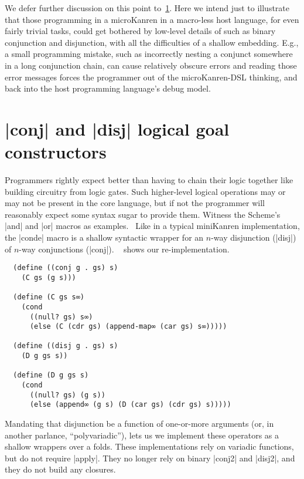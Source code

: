 \documentclass[sigplan,screen,draft,anonymous,review,natbib=false]{acmart}
\begin{document}
We defer further discussion on this point to~\cref{sec:conde}. Here we
intend just to illustrate that those programming in a microKanren in a
macro-less host language, for even fairly trivial tasks, could get
bothered by low-level details of such as binary conjunction and
disjunction, with all the difficulties of a shallow embedding. E.g., a
small programming mistake, such as incorrectly nesting a conjunct
somewhere in a long conjunction chain, can cause relatively obscure
errors and reading those error messages forces the programmer out of
the microKanren-DSL thinking, and back into the host programming
language's debug model.

\section{\rackinline|conj| and \rackinline|disj| logical goal
  constructors}\label{sec:conde}

Programmers rightly expect better than having to chain their logic
together like building circuitry from logic gates. Such higher-level
logical operations may or may not be present in the core language, but
if not the programmer will reasonably expect some syntax sugar to
provide them. Witness the Scheme's \rackinline|and| and
\rackinline|or| macros as examples.~\cite{shinn2013revisedreport} Like
in a typical miniKanren implementation, the \rackinline|conde| macro
is a shallow syntactic wrapper for an $n$-way disjunction
(\rackinline|disj|) of $n$-way conjunctions (\rackinline|conj|).
~ shows our
re-implementation.

\begin{listing}
  \begin{verbatim}
  (define ((conj g . gs) s)
    (C gs (g s)))

  (define (C gs s∞)
    (cond
      ((null? gs) s∞)
      (else (C (cdr gs) (append-map∞ (car gs) s∞)))))

  (define ((disj g . gs) s)
    (D g gs s))

  (define (D g gs s)
    (cond
      ((null? gs) (g s))
      (else (append∞ (g s) (D (car gs) (cdr gs) s)))))
  \end{verbatim}
  \caption{Re-implementations of \rackinline|conj| and \rackinline|disj|.}
  \label{mnt:conj-and-disj-reimplementation}
\end{listing}

Mandating that disjunction be a function of one-or-more arguments (or,
in another parlance, \enquote{polyvariadic}), lets us we implement
these operators as a shallow wrappers over a folds. These
implementations rely on variadic functions, but do not require
\rackinline|apply|. They no longer rely on binary \rackinline|conj2|
and \rackinline|disj2|, and they do not build any closures.
\end{document}
